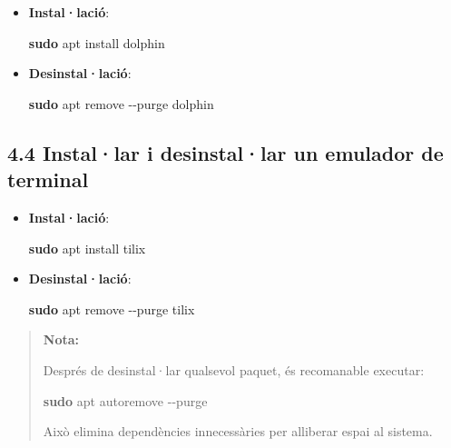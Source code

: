 \documentclass[
  a4paper,
]{article}
\newenvironment{Shaded}{\begin{snugshade}}{\end{snugshade}}
\newcommand{\AttributeTok}[1]{\textcolor[rgb]{0.13,0.29,0.53}{#1}}
\newcommand{\FunctionTok}[1]{\textcolor[rgb]{0.13,0.29,0.53}{\textbf{#1}}}
\newcommand{\NormalTok}[1]{#1}
\begin{document}
\begin{itemize}
\item
  \textbf{Instal·lació}:

\begin{Shaded}
\begin{Highlighting}[]
\FunctionTok{sudo}\NormalTok{ apt install dolphin}
\end{Highlighting}
\end{Shaded}
\item
  \textbf{Desinstal·lació}:

\begin{Shaded}
\begin{Highlighting}[]
\FunctionTok{sudo}\NormalTok{ apt remove }\AttributeTok{{-}{-}purge}\NormalTok{ dolphin}
\end{Highlighting}
\end{Shaded}
\end{itemize}

\subsection{4.4 Instal·lar i desinstal·lar un emulador de
terminal}\label{installar-i-desinstallar-un-emulador-de-terminal}

\begin{itemize}
\item
  \textbf{Instal·lació}:

\begin{Shaded}
\begin{Highlighting}[]
\FunctionTok{sudo}\NormalTok{ apt install tilix}
\end{Highlighting}
\end{Shaded}
\item
  \textbf{Desinstal·lació}:

\begin{Shaded}
\begin{Highlighting}[]
\FunctionTok{sudo}\NormalTok{ apt remove }\AttributeTok{{-}{-}purge}\NormalTok{ tilix}
\end{Highlighting}
\end{Shaded}
\end{itemize}

\begin{quote}
\textbf{Nota:}

Després de desinstal·lar qualsevol paquet, és recomanable executar:

\begin{Shaded}
\begin{Highlighting}[]
\FunctionTok{sudo}\NormalTok{ apt autoremove }\AttributeTok{{-}{-}purge}
\end{Highlighting}
\end{Shaded}

Això elimina dependències innecessàries per alliberar espai al sistema.
\end{quote}
\end{document}
